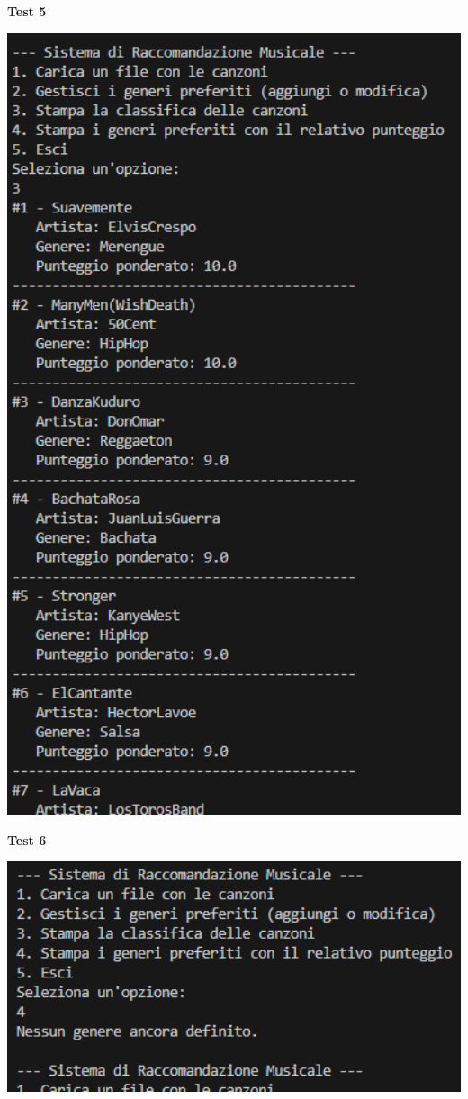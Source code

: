 \documentclass[a4paper,11pt]{article}
\begin{document}
    \newpage
    \begin{center}
        \textbf{Test 5}
        \par
        \vspace{0.5cm}
        \includegraphics[width=1\textwidth]{Immagini/Tests/htest5}
    \end{center}
    \begin{center}
        \textbf{Test 6}
        \par
        \vspace{0.5cm}
        \includegraphics[width=1\textwidth]{Immagini/Tests/htest6}
    \end{center}
\end{document}
